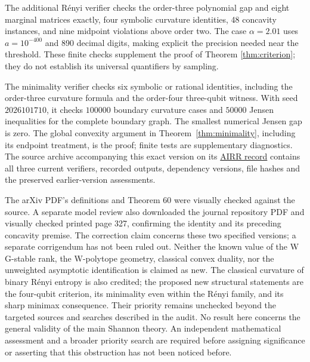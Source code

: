 \documentclass[11pt,a4paper]{article}
\begin{document}
The additional R\'enyi verifier checks the order-three polynomial
gap and eight marginal matrices exactly, four symbolic curvature
identities, 48 concavity instances, and nine midpoint violations
above order two. The case \(\alpha=2.01\) uses \(a=10^{-400}\)
and 890 decimal digits, making explicit the precision needed near
the threshold. These finite checks supplement the proof of
Theorem \ref{thm:criterion}; they do not establish its universal
quantifiers by sampling.

The minimality verifier checks six symbolic or rational identities,
including the order-three curvature formula and the order-four
three-qubit witness. With seed \(2026101710\), it checks
\(100000\) boundary curvature cases and \(50000\) Jensen inequalities
for the complete boundary graph. The smallest numerical Jensen
gap is zero. The global convexity argument in
Theorem~\ref{thm:minimality}, including its endpoint treatment,
is the proof; finite tests are supplementary diagnostics.
The source archive accompanying this exact version on its
\href{https://airr.science/papers/ARR-2026-68GTBBQT1T83QATJ/versions/v1/}{AIRR record}
contains all three current verifiers, recorded outputs, dependency
versions, file hashes and the preserved earlier-version assessments.

The arXiv PDF's definitions and Theorem 60 were visually checked
against the source. A separate model review also downloaded the journal repository PDF
and visually checked printed page 327, confirming the identity and
its preceding concavity premise. The correction
claim concerns these two specified versions; a separate corrigendum
has not been ruled out. Neither the known value of the W
G-stable rank, the W-polytope geometry, classical convex duality,
nor the unweighted asymptotic identification is claimed as new.
The classical curvature of binary R\'enyi entropy is also credited;
the proposed new structural statements are the four-qubit criterion,
its minimality even within the R\'enyi family, and its sharp minimax
consequence. Their priority remains unchecked
beyond the targeted sources and searches described in the audit.
No result here concerns the general validity of the main Shannon
theory. An independent mathematical assessment and a broader
priority search are required before assigning significance or
asserting that this obstruction has not been noticed before.
\end{document}
